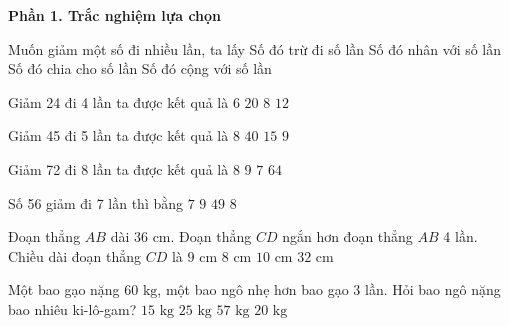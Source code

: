 \textbf{Phần 1. Trắc nghiệm lựa chọn}

\begin{ex} %
Muốn giảm một số đi nhiều lần, ta lấy
\choice
{Số đó trừ đi số lần}
{Số đó nhân với số lần}
{\True Số đó chia cho số lần}
{Số đó cộng với số lần}
\end{ex}

\begin{ex} %
Giảm 24 đi 4 lần ta được kết quả là
\choice
{\True $6$}
{$20$}
{$8$}
{$12$}
\end{ex}

\begin{ex} %
Giảm 45 đi 5 lần ta được kết quả là
\choice
{$8$}
{$40$}
{$15$}
{\True $9$}
\end{ex}

\begin{ex} %
Giảm 72 đi 8 lần ta được kết quả là
\choice
{$8$}
{\True $9$}
{$7$}
{$64$}
\end{ex}

\begin{ex} %
Số 56 giảm đi 7 lần thì bằng
\choice
{$7$}
{$9$}
{$49$}
{\True $8$}
\end{ex}

\begin{ex} %
Đoạn thẳng $AB$ dài $36\text{ cm}$. Đoạn thẳng $CD$ ngắn hơn đoạn thẳng $AB$ 4 lần. Chiều dài đoạn thẳng $CD$ là
\choice
{\True $9\text{ cm}$}
{$8\text{ cm}$}
{$10\text{ cm}$}
{$32\text{ cm}$}
\end{ex}

\begin{ex} %
Một bao gạo nặng $60\text{ kg}$, một bao ngô nhẹ hơn bao gạo 3 lần. Hỏi bao ngô nặng bao nhiêu ki-lô-gam?
\choice
{$15\text{ kg}$}
{$25\text{ kg}$}
{$57\text{ kg}$}
{\True $20\text{ kg}$}
\end{ex}

